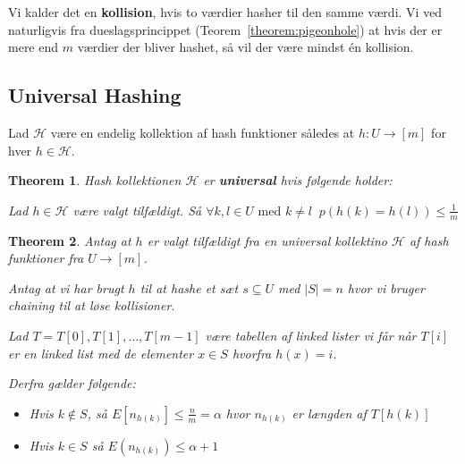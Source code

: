 \documentclass[11pt]{article}
\newtheorem{theorem}{Theorem}
\theoremstyle{definition}
\theoremstyle{remark}
\begin{document}
Vi kalder det en \textbf{kollision}, hvis to værdier hasher til den samme værdi. Vi ved naturligvis fra dueslagsprincippet (Teorem~\ref{theorem:pigeonhole}) at hvis der er mere end $m$ værdier der bliver hashet, så vil der være mindst én kollision. 


\subsection{Universal Hashing}

Lad $\mathcal{H}$ være en endelig kollektion af hash funktioner således at $h : U \rightarrow [m]$  for hver $h \in \mathcal{H}$.

\begin{theorem}
  Hash kollektionen $\mathcal{H}$ er \textbf{universal} hvis følgende holder:

  Lad $h \in \mathcal{H}$ være valgt tilfældigt. Så $\forall k, l \in U \text{ med } k \neq l \; \; p(h(k) = h(l)) \leq \frac{1}{m}$
  \end{theorem}

\begin{theorem}
  Antag at $h$ er valgt tilfældigt fra en universal kollektino $\mathcal{H}$ af hash funktioner fra $U \rightarrow [m]$.

  Antag at vi har brugt $h$ til at hashe et sæt $s \subseteq U$ med $|S| = n$ hvor vi bruger chaining til at løse kollisioner.

  Lad $T = T[0], T[1], \ldots, T[m-1]$ være tabellen af linked lister vi får når $T[i]$ er en linked list med de elementer $x \in S$ hvorfra $h(x) = i$.

  Derfra gælder følgende:
  \begin{itemize}
  \item Hvis $k \notin S$, så $E[n_{h(k)}] \leq \frac{n}{m} = \alpha$ hvor $n_{h(k)}$ er længden af $T[h(k)]$
  \item Hvis $k \in S$ så $E(n_{h(k)}) \leq \alpha + 1$
    \end{itemize}
 \end{theorem}
\end{document}
